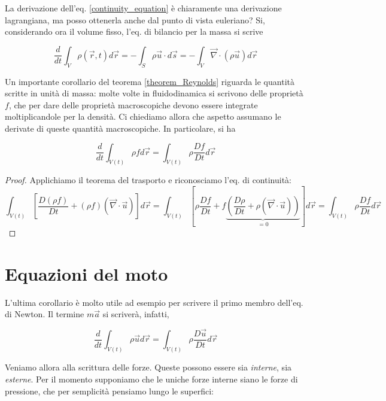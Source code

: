 \documentclass{report}
\begin{document}
La derivazione dell'eq. \ref{continuity_equation} è chiaramente una derivazione lagrangiana, ma posso ottenerla anche dal punto di vista euleriano? Si, considerando ora il volume fisso, l'eq. di bilancio per la massa si scrive 

\begin{equation}
    \frac{d}{dt}\int_V \rho(\vec{r}, t)d\vec{r} = - \int_S\rho\vec{u} \cdot d\vec{s} = -\int_V\vec{\nabla} \cdot(\rho\vec{u}) d\vec{r}
\end{equation}

Un importante corollario del teorema \ref{theorem_Reynolds} riguarda le quantità scritte in unità di massa: molte volte in fluidodinamica si scrivono delle proprietà $f$, che per dare delle proprietà macroscopiche devono essere integrate moltiplicandole per la densità. Ci chiediamo allora che aspetto assumano le derivate di queste quantità macroscopiche. In particolare, si ha

\begin{equation}
    \frac{d}{dt}\int_{V(t)} \rho f d\vec{r} = \int_{V(t)} \rho \frac{Df}{Dt}d\vec{r}
\end{equation}

\begin{proof}
    Applichiamo il teorema del trasporto e riconosciamo l'eq. di continuità: 
    \begin{equation}
        \int_{V(t)}\left[\frac{D(\rho f)}{Dt} + (\rho f)(\vec{\nabla} \cdot \vec{u})\right]d\vec{r} = \int_{V(t)}\left[\rho\frac{Df}{Dt} + f\underbrace{\left(\frac{D\rho}{Dt}+ \rho(\vec{\nabla}\cdot \vec{u}) \right)}_{=0}\right]d\vec{r} = \int_{V(t)} \rho \frac{Df}{Dt}d\vec{r}
    \end{equation}
\end{proof}


\section{Equazioni del moto}
L'ultima corollario è molto utile ad esempio per scrivere il primo membro dell'eq. di Newton. Il termine $m\vec{a}$ si scriverà, infatti, 

\begin{equation}
    \frac{d}{dt}\int_{V(t)}\rho \vec{u}d\vec{r} = \int_{V(t)}\rho \frac{D\vec{u}}{Dt}d\vec{r}
\end{equation}

Veniamo allora alla scrittura delle forze. Queste possono essere sia \emph{interne}, sia \emph{esterne}. Per il momento supponiamo che le uniche forze interne siano le forze di pressione, che per semplicità pensiamo lungo le superfici: 
\end{document}

